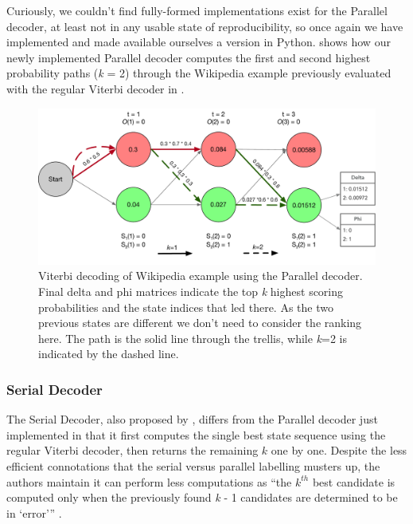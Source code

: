 {{{{{{{{Curiously, we couldn't find fully-formed implementations exist for the Parallel decoder, at least not in any usable state of reproducibility, so once again we have implemented and made available ourselves a version in Python.  shows how our newly implemented Parallel decoder computes the first and second highest probability paths (\textit{k} = 2) through the Wikipedia example previously evaluated with the regular Viterbi decoder in .

\begin{figure}
	\begin{center}
		\includegraphics[width=1.0\textwidth]{ch05_pyconcat/figures/parallel_viterbi.pdf}
	\end{center}
	\caption[Viterbi decoding of Wikipedia example using our decoder]{Viterbi decoding of Wikipedia example using the Parallel decoder. Final delta and phi matrices indicate the top \textit{k} highest scoring probabilities and the state indices that led there. As the two previous states are different we don't need to consider the ranking here. The path is the solid line through the trellis, while \textit{k}=2 is indicated by the dashed line.}
	\label{fig:viterbi_parallel}
\end{figure}

\subsubsection{Serial Decoder}

The Serial Decoder, also proposed by \cite{Seshadri1994}, differs from the Parallel decoder just implemented in that it first computes the single best state sequence using the regular Viterbi decoder, then returns the remaining $k$ one by one. Despite the less efficient connotations that the serial versus parallel labelling musters up, the authors maintain it can perform less computations as ``the $k^{th}$ best candidate is computed only when the previously found \textit{k} - 1 candidates are determined to be in `error''' \citep{Seshadri1994}.

}}}}}}}}
